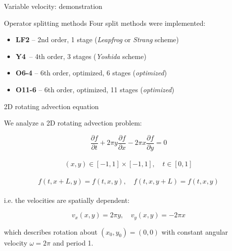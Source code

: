 \documentclass{beamer}
\begin{document}

\begin{frame}{Variable velocity: demonstration}


\end{frame}


\begin{frame}{Operator splitting methods}
Four split methods were implemented:

\begin{itemize} 
\item \textbf{LF2}\phantom{12} -- 2nd order, 1 stage (\emph{Leapfrog} or \emph{Strang} scheme)
\item \textbf{Y4}\phantom{1-2}\,  -- 4th order, 3 stages (\emph{Yoshida} scheme)
\item \textbf{O6-4}\phantom{1} -- 6th order, optimized, 6 stages (\emph{optimized})
\item \textbf{O11-6} -- 6th order, optimized, 11 stages (\emph{optimized})
\end{itemize}


\end{frame}

\begin{frame}{2D rotating advection equation}

We analyze a 2D rotating advection problem: 

$$\frac{\partial f}{\partial t} + 2\pi y \frac{\partial f}{\partial x} - 2\pi x \frac{\partial f}{\partial y} =  0$$\\[0.3em]
$$(x,y)\in[-1,1]\times [-1,1], \quad t\in [0,1]$$\\[0.3em]
$$f(t,x + L,y) = f(t,x,y),  \quad f(t,x,y+L) = f(t,x,y)$$\\[0.3em]

i.e. the velocities are spatially dependent: 

$$v_x(x,y) = 2\pi y, \quad v_y(x,y) = -2\pi x$$

which describes rotation about $(x_0,y_0) = (0,0)$ with constant angular velocity $\omega = 2\pi$ and period 1.


\end{frame}
\end{document}
